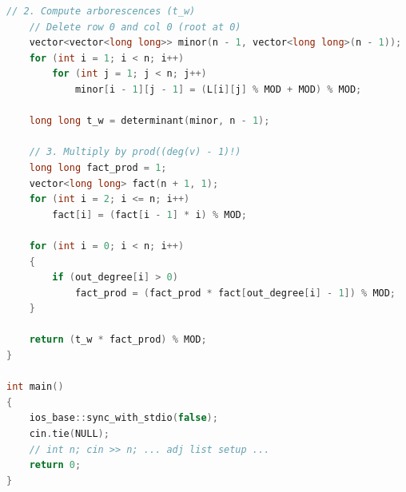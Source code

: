 \documentclass[10pt,landscape,a4paper,twocolumn]{article}
\begin{document}
\begin{lstlisting}[language=C++]
    // 2. Compute arborescences (t_w)
    // Delete row 0 and col 0 (root at 0)
    vector<vector<long long>> minor(n - 1, vector<long long>(n - 1));
    for (int i = 1; i < n; i++)
        for (int j = 1; j < n; j++)
            minor[i - 1][j - 1] = (L[i][j] % MOD + MOD) % MOD;

    long long t_w = determinant(minor, n - 1);

    // 3. Multiply by prod((deg(v) - 1)!)
    long long fact_prod = 1;
    vector<long long> fact(n + 1, 1);
    for (int i = 2; i <= n; i++)
        fact[i] = (fact[i - 1] * i) % MOD;

    for (int i = 0; i < n; i++)
    {
        if (out_degree[i] > 0)
            fact_prod = (fact_prod * fact[out_degree[i] - 1]) % MOD;
    }

    return (t_w * fact_prod) % MOD;
}

int main()
{
    ios_base::sync_with_stdio(false);
    cin.tie(NULL);
    // int n; cin >> n; ... adj list setup ...
    return 0;
}
\end{lstlisting}
\end{document}
